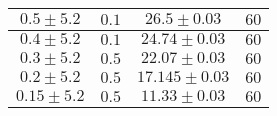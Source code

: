 \documentclass[@MAIN@]{subfile}
\begin{document}
\begin{tabular}{ ||c|c|c|c|| }
        \hline
        $0.5\pm 5.2$      & $0.1$       & $26.5\pm 0.03$   & $60$     \\
        \hline
        $0.4\pm 5.2$      & $0.1$       & $24.74\pm 0.03$  & $60$     \\
        \hline
        $0.3\pm 5.2$      & $0.5$       & $22.07\pm 0.03$  & $60$     \\
        \hline
        $0.2\pm 5.2$      & $0.5$       & $17.145\pm 0.03$ & $60$     \\
        \hline
        $0.15\pm 5.2$     & $0.5$       & $11.33\pm 0.03$  & $60$     \\
        \hline

    \end{tabular}
\end{document}
